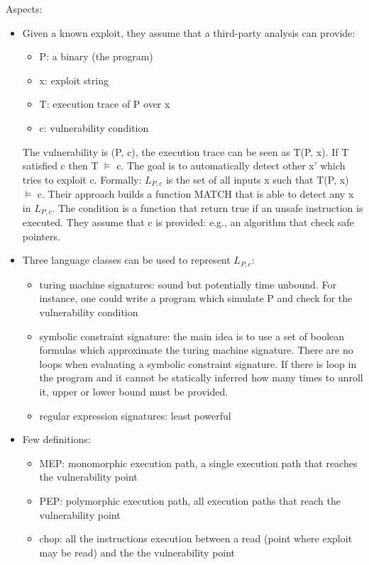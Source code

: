 Aspects:
\begin{itemize}
  \item Given a known exploit, they assume that a third-party analysis can provide:
    \begin{itemize}
      \item P: a binary (the program)
      \item x: exploit string
      \item T: execution trace of P over x
      \item c: vulnerability condition
    \end{itemize}
    The vulnerability is (P, c), the execution trace can be seen as T(P, x). If T satisfied c then T $\models$ c.
    The goal is to automatically detect other x' which tries to exploit c. Formally: $L_{P, c}$ is the set of all inputs x such that T(P, x) $\models$ c. Their approach builds a function MATCH that is able to detect any x in $L_{P, c}$. The condition is a function that return true if an unsafe instruction is executed. They assume that c is provided: e.g., an algorithm that check safe pointers.
  \item Three language classes can be used to represent $L_{P,c}$:
    \begin{itemize}
      \item turing machine signatures: sound but potentially time unbound. For instance, one could write a program which simulate P and check for the vulnerability condition
      \item symbolic constraint signature: the main idea is to use a set of boolean formulas which approximate the turing machine signature. There are no loops when evaluating a symbolic constraint signature. If there is loop in the program and it cannot be statically inferred how many times to unroll it, upper or lower bound must be provided.
      \item regular expression signatures: least powerful 
    \end{itemize}
  \item Few definitions:
    \begin{itemize}
      \item MEP: monomorphic execution path, a single execution path that reaches the vulnerability point
      \item PEP: polymorphic execution path, all execution paths that reach the vulnerability point
      \item chop: all the instructions execution between a read (point where exploit may be read) and the the vulnerability point

\end{itemize}
\end{itemize}
